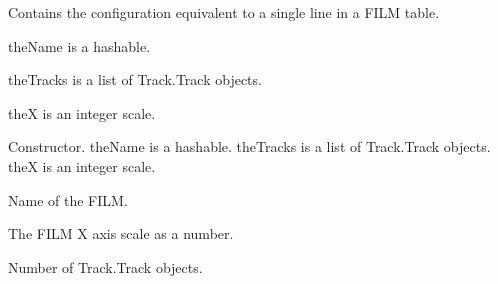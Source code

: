 \documentclass[letterpaper,10pt,english]{sphinxmanual}
\begin{document}
\begin{fulllineitems}
\label{\detokenize{ref/util/plot/FILMCfg:TotalDepth.util.plot.FILMCfg.PhysFilmCfg}}
Contains the configuration equivalent to a single line in a FILM table.

theName is a hashable.

theTracks is a list of Track.Track objects.

theX is an integer scale.

\begin{fulllineitems}
\label{\detokenize{ref/util/plot/FILMCfg:TotalDepth.util.plot.FILMCfg.PhysFilmCfg.__init__}}
Constructor.
theName is a hashable.
theTracks is a list of Track.Track objects.
theX is an integer scale.

\end{fulllineitems}


\begin{fulllineitems}
\label{\detokenize{ref/util/plot/FILMCfg:TotalDepth.util.plot.FILMCfg.PhysFilmCfg.name}}
Name of the FILM.

\end{fulllineitems}


\begin{fulllineitems}
\label{\detokenize{ref/util/plot/FILMCfg:TotalDepth.util.plot.FILMCfg.PhysFilmCfg.xScale}}
The FILM X axis scale as a number.

\end{fulllineitems}


\begin{fulllineitems}
\label{\detokenize{ref/util/plot/FILMCfg:TotalDepth.util.plot.FILMCfg.PhysFilmCfg.__len__}}
Number of Track.Track objects.


\end{fulllineitems}
\end{fulllineitems}
\end{document}
